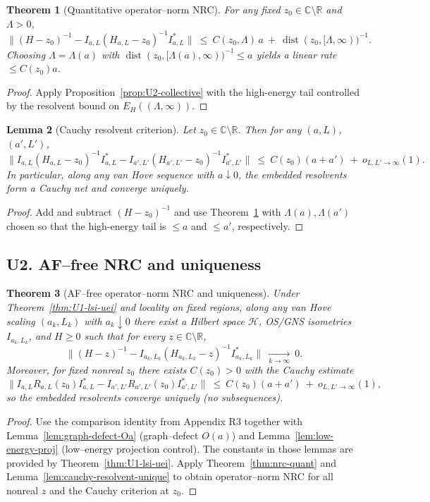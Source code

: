 \documentclass[11pt]{amsart}
\theoremstyle{plain}
\newtheorem{theorem}{Theorem}[section]
\newtheorem{lemma}[theorem]{Lemma}
\theoremstyle{definition}
\theoremstyle{remark}
\begin{document}
\begin{theorem}[Quantitative operator–norm NRC]\label{thm:U2-nrc-quant}
For any fixed $z_0\in\mathbb C\setminus\mathbb R$ and $\Lambda>0$,
\[
  \big\|(H-z_0)^{-1} - I_{a,L}(H_{a,L}-z_0)^{-1} I_{a,L}^*\big\|\ \le\ C(z_0,\Lambda)\,a\ +\ \operatorname{dist}(z_0,[\Lambda,\infty))^{-1}.
\]
Choosing $\Lambda=\Lambda(a)$ with $\operatorname{dist}(z_0,[\Lambda(a),\infty))^{-1}\le a$ yields a linear rate $\le C(z_0) a$.
\end{theorem}
\begin{proof}
Apply Proposition~\ref{prop:U2-collective} with the high-energy tail controlled by the resolvent bound on $E_H((\Lambda,\infty))$.
\end{proof}

\begin{lemma}[Cauchy resolvent criterion]\label{lem:U2-cauchy}
Let $z_0\in\mathbb C\setminus\mathbb R$. Then for any $(a,L)$, $(a',L')$,
\[
  \big\| I_{a,L}(H_{a,L}-z_0)^{-1}I_{a,L}^* - I_{a',L'}(H_{a',L'}-z_0)^{-1}I_{a',L'}^* \big\|\ \le\ C(z_0)(a+a')\ +\ o_{L,L'\to\infty}(1).
\]
In particular, along any van Hove sequence with $a\downarrow 0$, the embedded resolvents form a Cauchy net and converge uniquely.
\end{lemma}
\begin{proof}
Add and subtract $(H-z_0)^{-1}$ and use Theorem~\ref{thm:U2-nrc-quant} with $\Lambda(a),\Lambda(a')$ chosen so that the high-energy tail is $\le a$ and $\le a'$, respectively.
\end{proof}

\subsection{U2. AF–free NRC and uniqueness}
\begin{theorem}[AF–free operator–norm NRC and uniqueness]\label{thm:U2-nrc-unique}
Under Theorem~\ref{thm:U1-lsi-uei} and locality on fixed regions, along any van Hove scaling $(a_k,L_k)$ with $a_k\downarrow 0$ there exist a Hilbert space $\mathcal H$, OS/GNS isometries $I_{a_k,L_k}$, and $H\ge 0$ such that for every $z\in\mathbb C\setminus\mathbb R$,
\[
  \big\|(H-z)^{-1}-I_{a_k,L_k}(H_{a_k,L_k}-z)^{-1}I_{a_k,L_k}^*\big\|\ \xrightarrow[k\to\infty]{}\ 0.
\]
Moreover, for fixed nonreal $z_0$ there exists $C(z_0)>0$ with the Cauchy estimate
\[
  \big\| I_{a,L}R_{a,L}(z_0)I_{a,L}^* - I_{a',L'}R_{a',L'}(z_0)I_{a',L'}^* \big\|\ \le\ C(z_0)(a+a')\ +\ o_{L,L'\to\infty}(1),
\]
so the embedded resolvents converge uniquely (no subsequences).
\end{theorem}
\begin{proof}
Use the comparison identity from Appendix R3 together with Lemma~\ref{lem:graph-defect-Oa} (graph–defect $O(a)$) and Lemma~\ref{lem:low-energy-proj} (low–energy projection control). The constants in those lemmas are provided by Theorem~\ref{thm:U1-lsi-uei}. Apply Theorem~\ref{thm:nrc-quant} and Lemma~\ref{lem:cauchy-resolvent-unique} to obtain operator–norm NRC for all nonreal $z$ and the Cauchy criterion at $z_0$.
\end{proof}
\end{document}
